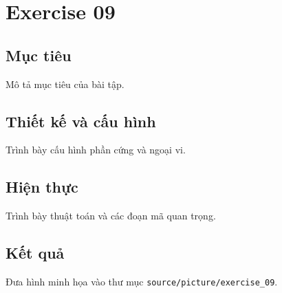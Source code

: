 \chapter{Exercise 09}
\section{Mục tiêu}
Mô tả mục tiêu của bài tập.
\section{Thiết kế và cấu hình}
Trình bày cấu hình phần cứng và ngoại vi.
\section{Hiện thực}
Trình bày thuật toán và các đoạn mã quan trọng.
\section{Kết quả}
Đưa hình minh họa vào thư mục \texttt{source/picture/exercise\_09}.
